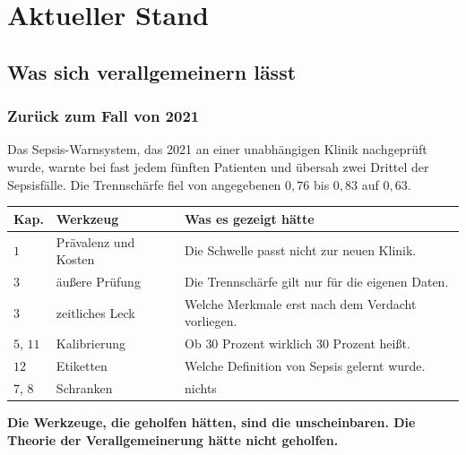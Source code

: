 \part{Aktueller Stand}

\chapter{Was sich verallgemeinern lässt}

\section{Zurück zum Fall von 2021}

\begin{merksatz}
Das Sepsis-Warnsystem, das 2021 an einer unabhängigen Klinik nachgeprüft wurde, warnte bei fast jedem fünften Patienten und übersah zwei Drittel der Sepsisfälle. Die Trennschärfe fiel von angegebenen $0{,}76$ bis $0{,}83$ auf $0{,}63$.

\begin{center}
{\small
\renewcommand{\arraystretch}{1.52}
\begin{tabular}{@{}P{1.2cm}P{3.4cm}P{4.0cm}@{}}
\toprule
\textbf{Kap.} & \textbf{Werkzeug} & \textbf{Was es gezeigt hätte}\\
\midrule
$1$ & Prävalenz und Kosten & Die Schwelle passt nicht zur neuen Klinik.\\
$3$ & äußere Prüfung & Die Trennschärfe gilt nur für die eigenen Daten.\\
$3$ & zeitliches Leck & Welche Merkmale erst nach dem Verdacht vorliegen.\\
$5$, $11$ & Kalibrierung & Ob $30$ Prozent wirklich $30$ Prozent heißt.\\
$12$ & Etiketten & Welche Definition von Sepsis gelernt wurde.\\
\midrule
$7$, $8$ & Schranken & \textcolor{akzent}{nichts}\\
\bottomrule
\end{tabular}}
\end{center}

\begin{center}
\begin{minipage}{0.9\textwidth}
\textbf{Die Werkzeuge, die geholfen hätten, sind die unscheinbaren. Die Theorie der Verallgemeinerung hätte nicht geholfen.}
\end{minipage}
\end{center}

\begin{center}
\begin{minipage}{0.88\textwidth}
\end{minipage}
\end{center}
\end{merksatz}

